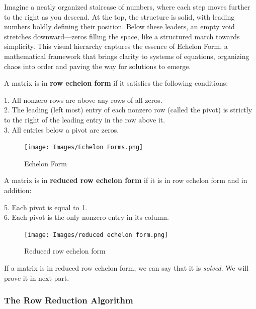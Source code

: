 \documentclass[a4paper,12pt]{article}
\begin{document}
    \begin{frame}
    
    \small Imagine a neatly organized staircase of numbers, where each step moves further to the right as you descend. At the top, the structure is solid, with leading numbers boldly defining their position. Below these leaders, an empty void stretches downward—zeros filling the space, like a structured march towards simplicity. This visual hierarchy captures the essence of Echelon Form, a mathematical framework that brings clarity to systems of equations, organizing chaos into order and paving the way for solutions to emerge.

    \begin{tcolorbox}[title=Definition,colframe=blue!70!black, colback=blue!5!white]
    A matrix is in \textbf{row echelon form} if it satisfies the following conditions:
    

  
    1. All nonzero rows are above any rows of all zeros.\\
     
    2. The leading (left most) entry of each nonzero row (called the pivot) is strictly to the right of the leading entry in the row above it.\\
    
    3. All entries below a pivot are zeros.\\
    \begin{figure}[H]
        \centering
        \texttt{[image: Images/Echelon Forms.png]}
        \caption{Echelon Form}
        \label{fig:enter-label}
    \end{figure}
    
    A matrix is in \textbf{reduced row echelon form} if it is in row echelon form and in addition:

    5. Each pivot is equal to 1.\\
    
    6. Each pivot is the only nonzero entry in its column.\\
    \begin{figure}[H]
        \centering
        \texttt{[image: Images/reduced echelon form.png]}
        \caption{Reduced row echelon form}
        \label{fig:enter-label}
    \end{figure}
\end{tcolorbox}
    If a matrix is in reduced row echelon form, we can say that it is \textit{solved}. We will prove it in next part.
    \end{frame}
\large \subsubsection{The Row Reduction Algorithm}
\end{document}
